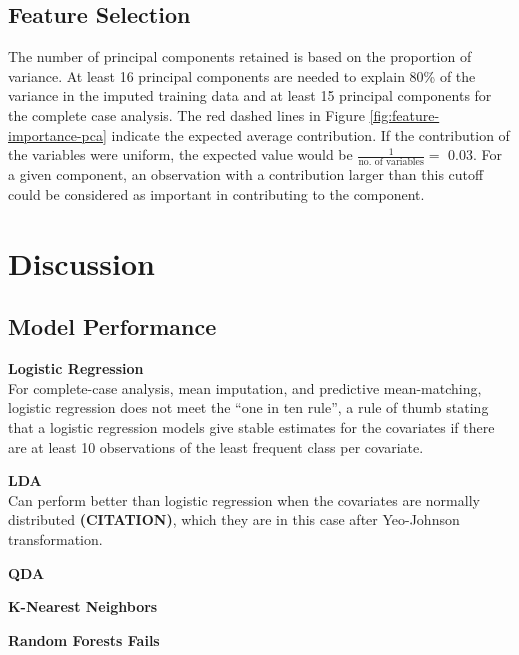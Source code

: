 \documentclass[12pt,]{article}
\begin{document}
\subsection{Feature Selection}\label{feature-selection-1}

The number of principal components retained is based on the proportion
of variance. At least 16 principal components are needed to explain 80\%
of the variance in the imputed training data and at least 15 principal
components for the complete case analysis. The red dashed lines in
Figure \ref{fig:feature-importance-pca} indicate the expected average
contribution. If the contribution of the variables were uniform, the
expected value would be \(\frac{1}{\text{no. of variables}} =\) 0.03.
For a given component, an observation with a contribution larger than
this cutoff could be considered as important in contributing to the
component.

\newpage

\section{Discussion}\label{discussion}

\subsection{Model Performance}\label{model-performance}

\textbf{Logistic Regression}\\
For complete-case analysis, mean imputation, and predictive
mean-matching, logistic regression does not meet the ``one in ten
rule'', a rule of thumb stating that a logistic regression models give
stable estimates for the covariates if there are at least 10
observations of the least frequent class per covariate.

\textbf{LDA}\\
Can perform better than logistic regression when the covariates are
normally distributed \textbf{(CITATION)}, which they are in this case
after Yeo-Johnson transformation.

\textbf{QDA}

\textbf{K-Nearest Neighbors}

\textbf{Random Forests Fails}
\end{document}

